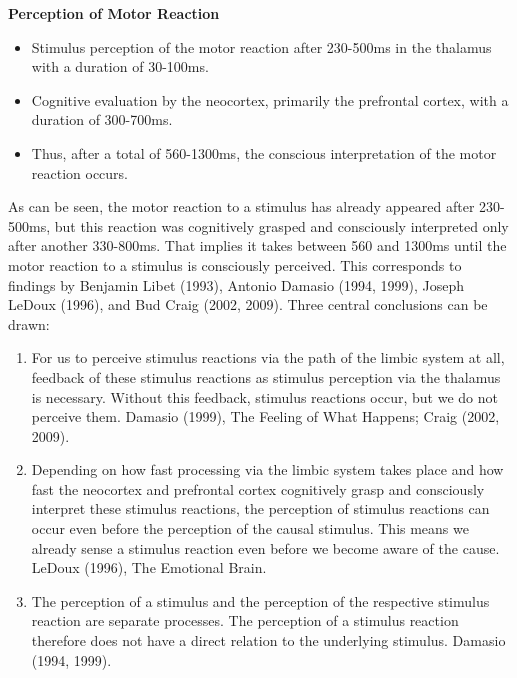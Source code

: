 \textbf{Perception of Motor Reaction}
\begin{itemize}
    \item Stimulus perception of the motor reaction after 230-500ms in the thalamus with a duration of 30-100ms.
    \item Cognitive evaluation by the neocortex, primarily the prefrontal cortex, with a duration of 300-700ms.
    \item Thus, after a total of 560-1300ms, the conscious interpretation of the motor reaction occurs.
\end{itemize}
As can be seen, the motor reaction to a stimulus has already appeared after 230-500ms, but this reaction was cognitively grasped and consciously interpreted only after another 330-800ms.
That implies it takes between 560 and 1300ms until the motor reaction to a stimulus is consciously perceived.
This corresponds to findings by Benjamin Libet (1993), Antonio Damasio (1994, 1999), Joseph LeDoux (1996), and Bud Craig (2002, 2009).
Three central conclusions can be drawn:

\begin{enumerate}
    \item For us to perceive stimulus reactions via the path of the limbic system at all, feedback of these stimulus reactions as stimulus perception via the thalamus is necessary.
    Without this feedback, stimulus reactions occur, but we do not perceive them. Damasio (1999), The Feeling of What Happens; Craig (2002, 2009).
    \item Depending on how fast processing via the limbic system takes place and how fast the neocortex and prefrontal cortex cognitively grasp and consciously interpret these stimulus reactions, the perception of stimulus reactions can occur even before the perception of the causal stimulus.
    This means we already sense a stimulus reaction even before we become aware of the cause. LeDoux (1996), The Emotional Brain.
    \item The perception of a stimulus and the perception of the respective stimulus reaction are separate processes.
    The perception of a stimulus reaction therefore does not have a direct relation to the underlying stimulus. Damasio (1994, 1999).
\end{enumerate}

